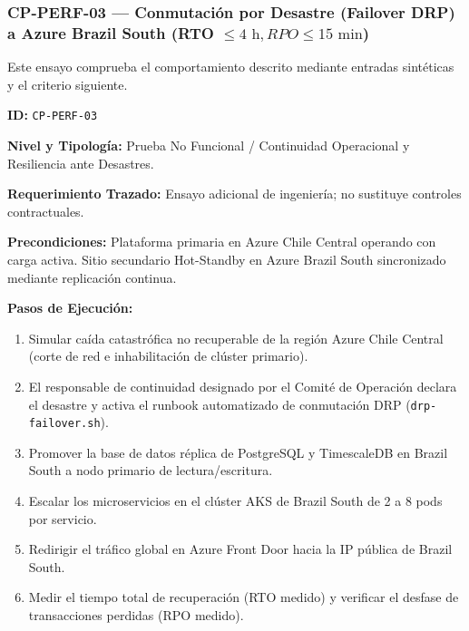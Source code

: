\subsubsection*{CP-PERF-03 — Conmutación por Desastre (Failover DRP) a Azure Brazil South (RTO $\le 4\text{ h}, RPO \le 15\text{ min}$)}\label{sec:9-cp-perf-03}
Este ensayo comprueba el comportamiento descrito mediante entradas sintéticas y el criterio siguiente.

\par\noindent \textbf{ID:} \texttt{CP-\allowbreak{}PERF-\allowbreak{}03}\par
\par\noindent \textbf{Nivel y Tipología:} Prueba No Funcional / Continuidad Operacional y Resiliencia ante Desastres.\par
\par\noindent \textbf{Requerimiento Trazado:} Ensayo adicional de ingeniería; no sustituye controles contractuales.\par
\par\noindent \textbf{Precondiciones:} Plataforma primaria en Azure Chile Central operando con carga activa. Sitio secundario Hot-Standby en Azure Brazil South sincronizado mediante replicación continua.\par
\par\noindent \textbf{Pasos de Ejecución:}\par
\begin{enumerate}
\item Simular caída catastrófica no recuperable de la región Azure Chile Central (corte de red e inhabilitación de clúster primario).
\item El responsable de continuidad designado por el Comité de Operación declara el desastre y activa el runbook automatizado de conmutación DRP (\texttt{drp-\allowbreak{}failover.sh}).
\item Promover la base de datos réplica de PostgreSQL y TimescaleDB en Brazil South a nodo primario de lectura/escritura.
\item Escalar los microservicios en el clúster AKS de Brazil South de 2 a 8 pods por servicio.
\item Redirigir el tráfico global en Azure Front Door hacia la IP pública de Brazil South.
\item Medir el tiempo total de recuperación (RTO medido) y verificar el desfase de transacciones perdidas (RPO medido).
\end{enumerate}

